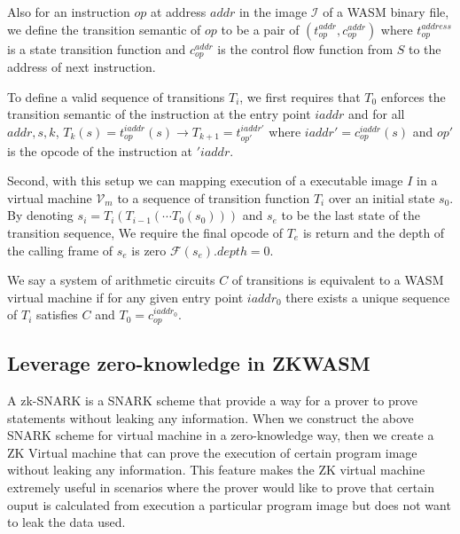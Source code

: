 Also for an instruction $op$ at address $addr$ in the image $\mathcal{I}$ of a WASM binary file, we define the transition semantic of $op$ to be a pair of $(t^{addr}_{op}, c^{addr}_{op})$ where $t^{address}_{op}$ is a state transition function and $c^{addr}_{op}$ is the control flow function from $S$ to the address of next instruction.

To define a valid sequence of transitions $T_i$, we first requires that $T_0$ enforces the transition semantic of the instruction at the entry point $iaddr$ and for all $addr, s, k$, $T_k(s) = t^{iaddr}_{op}(s) \rightarrow T_{k+1} = t_{op'}^{iaddr'}$ where $iaddr' = c_{op}^{iaddr}(s)$ and $op'$ is the opcode of the instruction at $'iaddr$.

Second, with this setup we can mapping execution of a executable image $I$ in a virtual machine $\mathcal{V}_m$ to a sequence of transition function $T_i$ over an initial state $s_0$. By denoting $s_i = T_i (T_{i-1}(\cdots T_0(s_0)))$ and $s_e$ to be the last state of the transition sequence, We require the final opcode of $T_{e}$ is return and the depth of the calling frame of $s_e$ is zero $\mathcal{F}(s_e).depth = 0$.

We say a system of arithmetic circuits $C$ of transitions is equivalent to a WASM virtual machine if for any given entry point $iaddr_0$ there exists a unique sequence of $T_i$ satisfies $C$ and $T_0 = c^{iaddr_0}_{op}$.

\subsection{Leverage zero-knowledge in ZKWASM}
A zk-SNARK is a SNARK scheme that provide a way for a prover to prove statements without leaking any information. When we construct the above SNARK scheme for virtual machine in a zero-knowledge way, then we create a ZK Virtual machine that can prove the execution of certain program image without leaking any information.  This feature makes the ZK virtual machine extremely useful in scenarios where the prover would like to prove that certain ouput is calculated from execution a particular program image but does not want to leak the data used.
 
